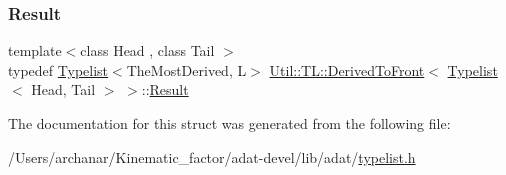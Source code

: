 \subsubsection{\texorpdfstring{Result}{Result}\hspace{0.1cm}{\footnotesize\ttfamily [3/3]}}
{\footnotesize\ttfamily template$<$class Head , class Tail $>$ \\
typedef \mbox{\hyperlink{structUtil_1_1Typelist}{Typelist}}$<$The\+Most\+Derived, L$>$ \mbox{\hyperlink{structUtil_1_1TL_1_1DerivedToFront}{Util\+::\+T\+L\+::\+Derived\+To\+Front}}$<$ \mbox{\hyperlink{structUtil_1_1Typelist}{Typelist}}$<$ Head, Tail $>$ $>$\+::\mbox{\hyperlink{structUtil_1_1TL_1_1DerivedToFront_3_01Typelist_3_01Head_00_01Tail_01_4_01_4_ae5fcbfce9e50c52c4c5cfe7626e32ddd}{Result}}}



The documentation for this struct was generated from the following file\+:\begin{DoxyCompactItemize}
\item 
/\+Users/archanar/\+Kinematic\+\_\+factor/adat-\/devel/lib/adat/\mbox{\hyperlink{adat-devel_2lib_2adat_2typelist_8h}{typelist.\+h}}\end{DoxyCompactItemize}
